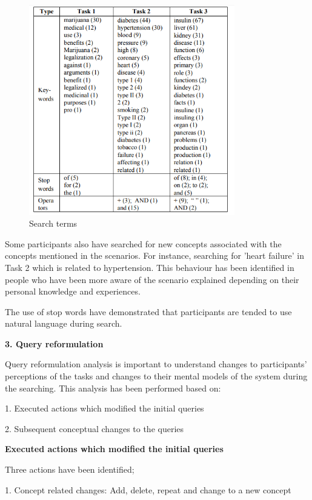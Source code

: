 \documentclass[]{article}
\begin{document}
\begin{figure}[t!]
	\includegraphics[width=0.8\textwidth]{Capture17.png}
	\caption{Search terms \label{fig17}}
\end{figure} 

Some participants also have searched for new concepts associated with the concepts mentioned in the scenarios. For instance, searching for 'heart failure' in Task 2 which is related to hypertension. This behaviour has been identified in people who have been more aware of the scenario explained depending on their personal knowledge and experiences.

The use of stop words have demonstrated that participants are tended to use natural language during search. 

\textbf{3. Query reformulation}

Query reformulation analysis is important to understand changes to participants' perceptions of the tasks and changes to their mental models of the system during the searching. This analysis has been performed based on:

1. Executed actions which modified the initial queries

2. Subsequent conceptual changes to the queries

\textbf{Executed actions which modified the initial queries}

Three actions have been identified;

1. Concept related changes: Add, delete, repeat and change to a new concept
\end{document}
